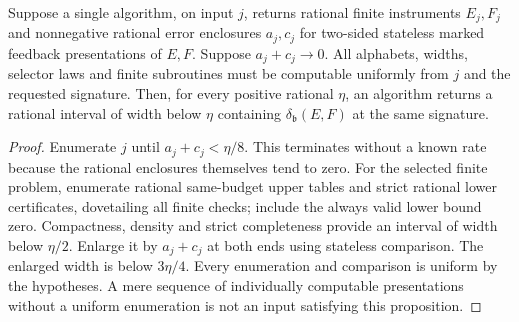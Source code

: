 \begin{proposition}
\label{prop:v17-effective}
Suppose a single algorithm, on input $j$, returns rational finite
instruments $E_j,F_j$ and nonnegative rational error enclosures
$a_j,c_j$ for two-sided stateless marked feedback presentations of
$E,F$. Suppose $a_j+c_j\to0$. All alphabets, widths, selector laws and
finite subroutines must be computable uniformly from $j$ and the
requested signature. Then, for every positive rational $\eta$, an
algorithm returns a rational interval of width below $\eta$ containing
$\delta_{\mathfrak b}(E,F)$ at the same signature.
\end{proposition}
\begin{proof}
Enumerate $j$ until $a_j+c_j<\eta/8$. This terminates without a known
rate because the rational enclosures themselves tend to zero.
For the selected finite problem, enumerate rational same-budget upper
tables and strict rational lower certificates, dovetailing all finite
checks; include the always valid lower bound zero. Compactness,
density and strict completeness provide an interval of width below
$\eta/2$. Enlarge it by $a_j+c_j$ at both ends using stateless
comparison. The enlarged width is below $3\eta/4$. Every enumeration
and comparison is uniform by the hypotheses. A mere sequence of
individually computable presentations without a uniform enumeration
is not an input satisfying this proposition.
\end{proof}
